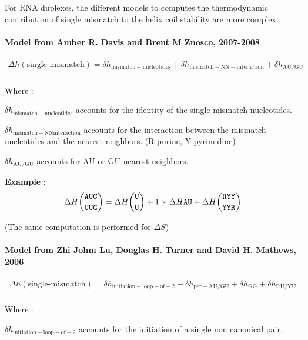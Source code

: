 \documentclass{article}
\begin{document}
For RNA duplexes, the different models to computes the thermodynamic contribution of single mismatch to the helix coil 
stability are more complex.


\paragraph{\textbf{Model from Amber R. Davis and Brent M Znosco, 2007-2008}}

\begin{multline*}
\Delta h {(\mbox{single-mismatch})} = 
\delta{}h_\mathrm{mismatch-nucleotides} +
\delta{}h_\mathrm{mismatch-NN-interaction} +
\delta{}h_\mathrm{AU/GU} \\
\end{multline*}

Where :

$\delta{}h_\mathrm{mismatch-nucleotides}$ accounts for the identity of the single mismatch nucleotides.

$\delta{}h_\mathrm{mismatch-NN interaction}$ accounts for the interaction between the mismatch nucleotides and 
the nearest neighbors. (R purine, Y pyrimidine)

$\delta{}h_\mathrm{AU/GU}$ accounts for AU or GU nearest neighbors.

\textbf{Example} :
\begin{multline*}
\Delta H {\mbox{\texttt{AUC}} \choose \mbox{\texttt{UUG}}} = 
\Delta H {\mbox{\texttt{U}} \choose \mbox{\texttt{U}} } + 
1 \times \Delta H {\mbox{\texttt{AU}} } +
\Delta H {\mbox{\texttt{RYY}} \choose \mbox{\texttt{YYR}} } \\
\end{multline*}

       (The same computation is performed for $\Delta S$)
       

\paragraph{\textbf{Model from Zhi Johm Lu, Douglas H. Turner and David H. Mathews, 2006}}

\begin{multline*}
\Delta h {(\mbox{single-mismatch})} =
\delta{}h_\mathrm{initiation-loop-of-2} +
\delta{}h_\mathrm{per-AU/GU} +
\delta{}h_\mathrm{GG} +
\delta{}h_\mathrm{RU/YU}\\
\end{multline*}

Where :

$\delta{}h_\mathrm{initiation-loop-of-2}$ accounts for the initiation of a single non canonical pair.
\end{document}
